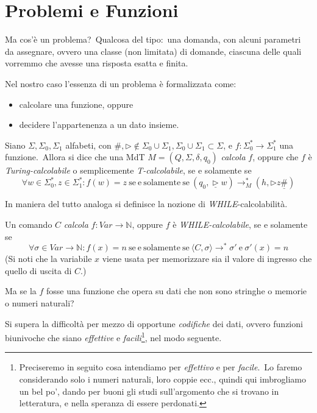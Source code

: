 \section{Problemi e Funzioni}

Ma cos'è un problema?\ Qualcosa del tipo:\ una domanda, con alcuni parametri da assegnare, ovvero una classe (non limitata) di domande, ciascuna delle quali vorremmo che avesse una risposta esatta e finita.

Nel nostro caso l'essenza di un problema è formalizzata come:
\begin{itemize}
    \item calcolare una funzione, oppure
    \item decidere l'appartenenza a un dato insieme.
\end{itemize}

\begin{definition}
    Siano $\Sigma, \Sigma_0, \Sigma_1$ alfabeti, con $\#, \triangleright \notin \Sigma_0 \cup \Sigma_1, \Sigma_0 \cup \Sigma_1 \subset \Sigma$, e $f:\Sigma_0^*\rightarrow\Sigma_1^*$ una funzione.\
    Allora si dice che una MdT $M=(Q,\Sigma,\delta, q_0)$ \textit{calcola} $f$, oppure che $f$ è \textit{Turing-calcolabile} o semplicemente \textit{T-calcolabile}, se e solamente se
    \[\forall w\in\Sigma_0^*, z\in\Sigma_1^* : f(w)=z\ \mathrm{se\ e\ solamente\ se}\ (q_0,\underline{\triangleright} w)\rightarrow_M^*(h,\triangleright z \underline{\#})\]
\end{definition}

\noindent In maniera del tutto analoga si definisce la nozione di \textit{\footnotesize WHILE}-calcolabilità.\

\begin{definition}
    Un comando $C$ \textit{calcola} $f:\mathit{Var}\rightarrow\mathbb{N}$, oppure $f$ è \textit{{\footnotesize WHILE}-calcolabile}, se e solamente se
    \[\forall \sigma \in \mathit{Var} \rightarrow \mathbb{N}:f(x)=n\ \mathrm{se\ e\ solamente\ se}\ \langle C,\sigma\rangle \rightarrow^*\sigma'\ \mathrm{e}\ \sigma'(x)=n\]
    (Si noti che la variabile $x$ viene usata per memorizzare sia il valore di ingresso che quello di uscita di $C$.)
\end{definition}

\begin{question}
    Ma se la $f$ fosse una funzione che opera su dati che non sono stringhe o memorie o numeri naturali?
\end{question}

\noindent Si supera la difficoltà per mezzo di opportune \textit{codifiche} dei dati, ovvero funzioni biunivoche che siano \textit{effettive} e \textit{facili}\footnote{Preciseremo in seguito cosa intendiamo per \textit{effettivo} e per \textit{facile}.\ Lo faremo considerando solo i numeri naturali, loro coppie ecc., quindi qui imbrogliamo un bel po', dando per buoni gli studi sull'argomento che si trovano in letteratura, e nella speranza di essere perdonati.}, nel modo seguente.

